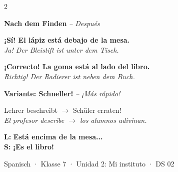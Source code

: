 \documentclass[11pt, a4paper]{article}
\newcommand{\seriftext}[1]{{\fontfamily{ppl}\selectfont #1}}
\newcommand{\es}[1]{\seriftext{\textbf{\textcolor{spanischrot}{#1}}}}
\newcommand{\estar}[1]{\seriftext{\textbf{\textcolor{blau}{#1}}}}
\newcommand{\de}[1]{{\small\textcolor{dunkelgrau}{\textit{#1}}}}
\begin{document}
\vspace{6pt}


\begin{multicols}{2}

\begin{praepbox}
\textbf{Nach dem Finden} \de{-- Después}

\vspace{4pt}

\estar{¡Sí! El lápiz está debajo de la mesa.}\\
\de{Ja! Der Bleistift ist unter dem Tisch.}

\vspace{4pt}

\estar{¡Correcto! La goma está al lado del libro.}\\
\de{Richtig! Der Radierer ist neben dem Buch.}
\end{praepbox}

\columnbreak

\begin{praepbox}
\textbf{Variante: Schneller!} \de{-- ¡Más rápido!}

\vspace{4pt}

Lehrer beschreibt $\rightarrow$ Schüler erraten!\\
\de{El profesor describe $\rightarrow$ los alumnos adivinan.}

\vspace{4pt}

\textbf{L:} \estar{Está encima de la mesa...}\\
\textbf{S:} \es{¡Es el libro!}
\end{praepbox}

\end{multicols}

\vspace{8pt}


\begin{center}
\end{center}

\vspace{6pt}

\begin{center}
{\footnotesize\textcolor{dunkelgrau}{Spanisch · Klasse 7 · Unidad 2: Mi instituto · DS 02}}
\end{center}
\end{document}
